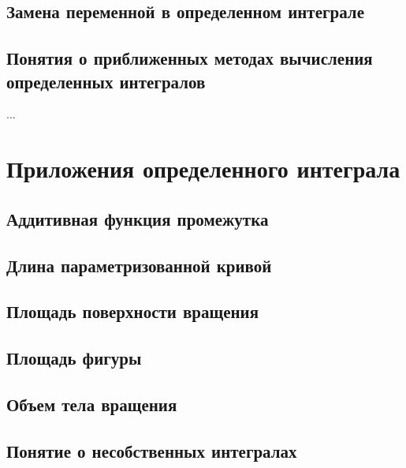 \subsection{Замена переменной в определенном интеграле}
\subsection{Понятия о приближенных методах вычисления определенных интегралов}
...

\section{Приложения определенного интеграла}
\subsection{Аддитивная функция промежутка}
\subsection{Длина параметризованной кривой} 
\subsection{Площадь поверхности вращения}
\subsection{Площадь фигуры}
\subsection{Объем тела вращения}
\subsection{Понятие о несобственных интегралах}

